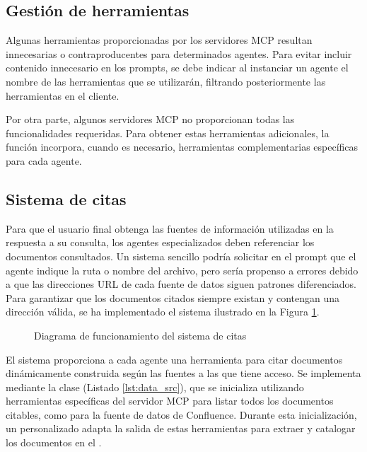 \subsection{Gestión de herramientas}
Algunas herramientas proporcionadas por los servidores MCP resultan innecesarias o contraproducentes para determinados agentes. Para evitar incluir contenido innecesario en los prompts, se debe indicar al instanciar un agente el nombre de las herramientas que se utilizarán, filtrando posteriormente las herramientas en el cliente.

Por otra parte, algunos servidores MCP no proporcionan todas las funcionalidades requeridas. Para obtener estas herramientas adicionales, la función  incorpora, cuando es necesario, herramientas complementarias específicas para cada agente.

\subsection{Sistema de citas}
Para que el usuario final obtenga las fuentes de información utilizadas en la respuesta a su consulta, los agentes especializados deben referenciar los documentos consultados. Un sistema sencillo podría solicitar en el prompt que el agente indique la ruta o nombre del archivo, pero sería propenso a errores debido a que las direcciones URL de cada fuente de datos siguen patrones diferenciados. Para garantizar que los documentos citados siempre existan y contengan una dirección válida, se ha implementado el sistema ilustrado en la Figura \ref{fig:citations}.

\begin{figure}[h]
  \centering
  \caption{Diagrama de funcionamiento del sistema de citas}
  \label{fig:citations}
\end{figure}
El sistema proporciona a cada agente una herramienta para citar documentos dinámicamente construida según las fuentes a las que tiene acceso. Se implementa mediante la clase  (Listado \ref{lst:data_src}), que se inicializa utilizando herramientas específicas del servidor MCP para listar todos los documentos citables, como  para la fuente de datos de Confluence. Durante esta inicialización, un  personalizado adapta la salida de estas herramientas para extraer y catalogar los documentos en el .

